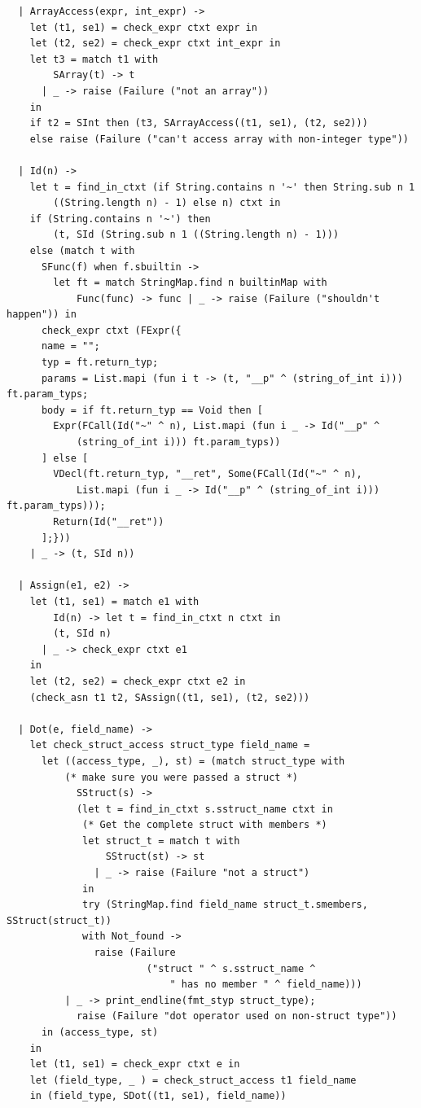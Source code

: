 \documentclass[12pt]{article}
\begin{document}
\begin{mdframed}[hidealllines=true,backgroundcolor=blue!20]
\begin{lstlisting}
  | ArrayAccess(expr, int_expr) ->
    let (t1, se1) = check_expr ctxt expr in
    let (t2, se2) = check_expr ctxt int_expr in
    let t3 = match t1 with 
        SArray(t) -> t 
      | _ -> raise (Failure ("not an array"))
    in
    if t2 = SInt then (t3, SArrayAccess((t1, se1), (t2, se2)))
    else raise (Failure ("can't access array with non-integer type"))

  | Id(n) -> 
    let t = find_in_ctxt (if String.contains n '~' then String.sub n 1 
        ((String.length n) - 1) else n) ctxt in
    if (String.contains n '~') then 
        (t, SId (String.sub n 1 ((String.length n) - 1)))
    else (match t with
      SFunc(f) when f.sbuiltin -> 
        let ft = match StringMap.find n builtinMap with 
            Func(func) -> func | _ -> raise (Failure ("shouldn't happen")) in
      check_expr ctxt (FExpr({
      name = "";
      typ = ft.return_typ;
      params = List.mapi (fun i t -> (t, "__p" ^ (string_of_int i))) ft.param_typs;
      body = if ft.return_typ == Void then [
        Expr(FCall(Id("~" ^ n), List.mapi (fun i _ -> Id("__p" ^ 
            (string_of_int i))) ft.param_typs))
      ] else [
        VDecl(ft.return_typ, "__ret", Some(FCall(Id("~" ^ n), 
            List.mapi (fun i _ -> Id("__p" ^ (string_of_int i))) ft.param_typs)));
        Return(Id("__ret"))
      ];}))
    | _ -> (t, SId n))

  | Assign(e1, e2) ->
    let (t1, se1) = match e1 with
        Id(n) -> let t = find_in_ctxt n ctxt in
        (t, SId n)
      | _ -> check_expr ctxt e1 
    in
    let (t2, se2) = check_expr ctxt e2 in
    (check_asn t1 t2, SAssign((t1, se1), (t2, se2)))

  | Dot(e, field_name) -> 
    let check_struct_access struct_type field_name = 
      let ((access_type, _), st) = (match struct_type with
          (* make sure you were passed a struct *)
            SStruct(s) ->
            (let t = find_in_ctxt s.sstruct_name ctxt in 
             (* Get the complete struct with members *)
             let struct_t = match t with 
                 SStruct(st) -> st 
               | _ -> raise (Failure "not a struct")
             in
             try (StringMap.find field_name struct_t.smembers, SStruct(struct_t))
             with Not_found -> 
               raise (Failure 
                        ("struct " ^ s.sstruct_name ^ 
                            " has no member " ^ field_name)))
          | _ -> print_endline(fmt_styp struct_type); 
            raise (Failure "dot operator used on non-struct type"))
      in (access_type, st)
    in
    let (t1, se1) = check_expr ctxt e in
    let (field_type, _ ) = check_struct_access t1 field_name 
    in (field_type, SDot((t1, se1), field_name))


\end{lstlisting}
\end{mdframed}
\end{document}
